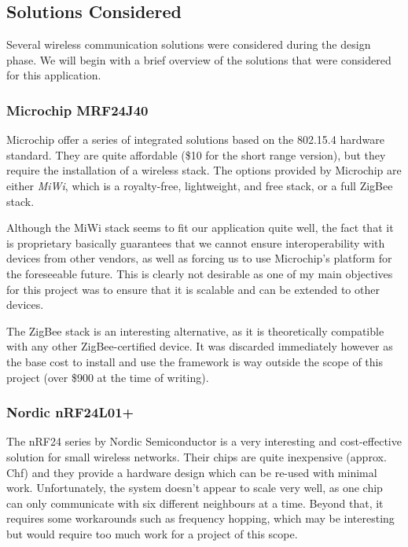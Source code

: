 \subsection{Solutions Considered}

Several wireless communication solutions were considered during the design
phase. We will begin with a brief overview of the solutions that were considered
for this application.

\subsubsection{Microchip MRF24J40}

Microchip offer a series of integrated solutions
based on the 802.15.4
hardware standard. They are quite affordable (\$10 for the short range version),
but they require the installation of a wireless stack. The options provided by
Microchip are either \emph{MiWi}, which is a royalty-free, lightweight, and free
stack, or a full ZigBee stack.

Although the MiWi stack seems to fit our application quite well, the fact that
it is proprietary basically guarantees that we cannot ensure interoperability
with devices from other vendors, as well as forcing us to use Microchip's
platform for the foreseeable future. This is clearly not desirable as one of my
main objectives for this project was to ensure that it is scalable and can be
extended to other devices.

The ZigBee stack is an interesting alternative, as it is theoretically
compatible with any other ZigBee-certified device. It was discarded immediately
however as the base cost to install and use the framework is way outside the
scope of this project (over \$900 at the time of writing).

\subsubsection{Nordic nRF24L01+}

The nRF24 series by Nordic Semiconductor is a
very interesting and cost-effective solution for small wireless networks. Their
chips are quite inexpensive (approx. \unit[7]{Chf}) and they provide a hardware
design which can be re-used with minimal work. Unfortunately, the system doesn't
appear to scale very well, as one chip can only communicate with six different
neighbours at a time. Beyond that, it requires some workarounds such as
frequency hopping, which may be interesting but would require too much work for
a project of this scope.

